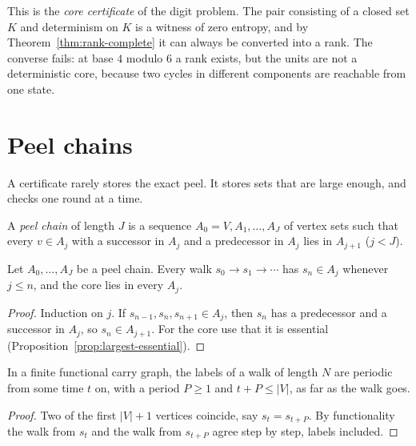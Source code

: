 This is the \emph{core certificate} of the digit problem. The pair consisting of a closed set
\(K\) and determinism on \(K\) is a witness of zero entropy, and by
Theorem~\ref{thm:rank-complete} it can always be converted into a rank. The converse fails: at
base \(4\) modulo \(6\) a rank exists, but the units are not a deterministic core, because two
cycles in different components are reachable from one state.

\section{Peel chains}

A certificate rarely stores the exact peel. It stores sets that are large enough, and checks
one round at a time.

\begin{definition}\label{def:peel-chain}
A \emph{peel chain} of length \(J\) is a sequence \(A_0=V,A_1,\dots,A_J\) of
vertex sets such that every \(v\in A_j\) with a successor in \(A_j\) and a predecessor in \(A_j\)
lies in \(A_{j+1}\) (\(j<J\)).
\end{definition}

\begin{proposition}\label{prop:peel-chain}
Let \(A_0,\dots,A_J\) be a peel chain. Every walk \(s_0\to s_1\to\cdots\) has \(s_n\in A_j\)
whenever \(j\le n\), and the core lies in every \(A_j\).
\end{proposition}

\begin{proof}
Induction on \(j\). If \(s_{n-1},s_n,s_{n+1}\in A_j\), then \(s_n\) has a predecessor and a
successor in \(A_j\), so \(s_n\in A_{j+1}\). For the core use that it is essential
(Proposition~\ref{prop:largest-essential}).
\end{proof}

\begin{proposition}\label{prop:functional-walk}
In a finite functional carry graph, the labels of a walk of length \(N\) are periodic from some
time \(t\) on, with a period \(P\ge1\) and \(t+P\le|V|\), as far as the walk goes.
\end{proposition}

\begin{proof}
Two of the first \(|V|+1\) vertices coincide, say \(s_t=s_{t+P}\). By functionality the walk
from \(s_t\) and the walk from \(s_{t+P}\) agree step by step, labels included.
\end{proof}

